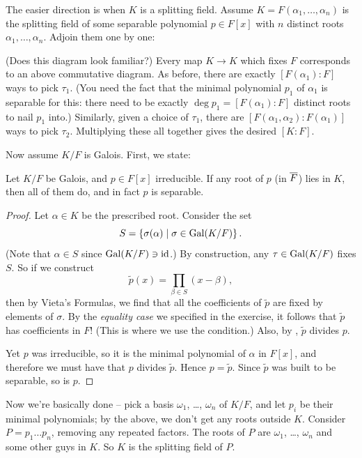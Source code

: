 The easier direction is when $K$ is a splitting field.
Assume $K = F(\alpha_1, \dots, \alpha_n)$ is the splitting field of some separable polynomial $p \in F[x]$
with $n$ distinct roots $\alpha_1, \dots, \alpha_n$.
Adjoin them one by one:
\begin{center}
\end{center}
(Does this diagram look familiar?)
Every map $K \to K$ which fixes $F$ corresponds to an above commutative diagram.
As before, there are exactly $[F(\alpha_1) : F]$ ways to pick $\tau_1$.
(You need the fact that the minimal polynomial $p_1$ of $\alpha_1$ is separable for this:
there need to be exactly $\deg p_1 = [F(\alpha_1) : F]$ distinct roots to nail $p_1$ into.)
Similarly, given a choice of $\tau_1$, there are $[F(\alpha_1, \alpha_2) : F(\alpha_1)]$ ways to pick $\tau_2$.
Multiplying these all together gives the desired $[K:F]$.

\bigskip

Now assume $K/F$ is Galois.
First, we state:
\begin{lemma}
	Let $K/F$ be Galois, and $p \in F[x]$ irreducible.
	If any root of $p$ (in $\overline F$) lies in $K$, then all of them do,
	and in fact $p$ is separable.
\end{lemma}
\begin{proof}
	Let $\alpha \in K$ be the prescribed root.
	Consider the set
	\[ S = \left\{ \sigma(\alpha) \mid \sigma \in \operatorname{Gal}(K/F) \right\}. \]
	(Note that $\alpha \in S$ since $\operatorname{Gal}(K/F) \ni \mathrm{id}$.)
	By construction, any $\tau \in \operatorname{Gal}(K/F)$ fixes $S$.
	So if we construct
	\[ \tilde p(x) = \prod_{\beta \in S} (x - \beta), \]
	then by Vieta's Formulas, we find that all the coefficients of $\tilde p$ are fixed by elements of $\sigma$.
	By the \emph{equality case} we specified in the exercise, it follows that $\tilde p$ has coefficients in $F$!
	(This is where we use the condition.)
	Also, by , $\tilde p$ divides $p$.

	Yet $p$ was irreducible, so it is the minimal polynomial of $\alpha$ in $F[x]$,
	and therefore we must have that $p$ divides $\tilde p$.
	Hence $p = \tilde p$. Since $\tilde p$ was built to be separable, so is $p$.
\end{proof}
Now we're basically done -- pick a basis $\omega_1$, \dots, $\omega_n$ of $K/F$,
and let $p_i$ be their minimal polynomials; by the above, we don't get any roots outside $K$.
Consider $P = p_1 \dots p_n$, removing any repeated factors.
The roots of $P$ are $\omega_1$, \dots, $\omega_n$ and some other guys in $K$.
So $K$ is the splitting field of $P$.
